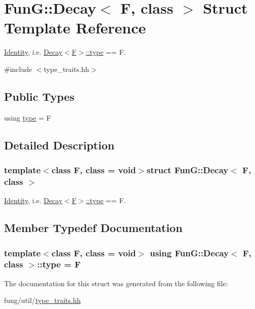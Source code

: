 \hypertarget{structFunG_1_1Decay}{}\section{Fun\+G\+:\+:Decay$<$ F, class $>$ Struct Template Reference}
\label{structFunG_1_1Decay}


\hyperlink{structFunG_1_1Identity}{Identity}, i.\+e. \hyperlink{structFunG_1_1Decay_a4b2916cbb7c8587ab3fccc9b896b9df4}{Decay$<$\+F$>$\+::type} == F.  




{\ttfamily \#include $<$type\+\_\+traits.\+hh$>$}

\subsection*{Public Types}
\begin{DoxyCompactItemize}
\item 
using \hyperlink{structFunG_1_1Decay_a4b2916cbb7c8587ab3fccc9b896b9df4}{type} = F
\end{DoxyCompactItemize}


\subsection{Detailed Description}
\subsubsection*{template$<$class F, class = void$>$struct Fun\+G\+::\+Decay$<$ F, class $>$}

\hyperlink{structFunG_1_1Identity}{Identity}, i.\+e. \hyperlink{structFunG_1_1Decay_a4b2916cbb7c8587ab3fccc9b896b9df4}{Decay$<$\+F$>$\+::type} == F. 

\subsection{Member Typedef Documentation}
\hypertarget{structFunG_1_1Decay_a4b2916cbb7c8587ab3fccc9b896b9df4}{}
\subsubsection[{type}]{\setlength{\rightskip}{0pt plus 5cm}template$<$class F, class  = void$>$ using {\bf Fun\+G\+::\+Decay}$<$ F, class $>$\+::{\bf type} =  F}\label{structFunG_1_1Decay_a4b2916cbb7c8587ab3fccc9b896b9df4}


The documentation for this struct was generated from the following file\+:\begin{DoxyCompactItemize}
\item 
fung/util/\hyperlink{type__traits_8hh}{type\+\_\+traits.\+hh}\end{DoxyCompactItemize}
